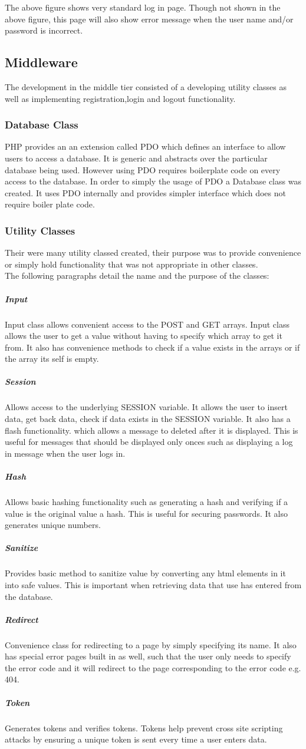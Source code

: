 \documentclass[a4paper,oneside,11pt]{report}
\begin{document}
The above figure shows very standard log in page. Though not shown in the above figure, this page will also show error message when the user name and/or password is incorrect.
\subsection{Middleware}
The development in the middle tier consisted of a developing utility classes as well as implementing registration,login and logout functionality.

\subsubsection{Database Class}
PHP provides an an extension called PDO which defines an interface to allow users to access a database. It is generic and abstracts over the particular database being used. However using PDO requires boilerplate code on every access to the database. In order to simply the usage of PDO a Database class was created. It uses PDO internally and provides simpler interface which does not require boiler plate code. 
\subsubsection{Utility Classes}
Their were many utility classed created, their purpose was to provide convenience or simply hold functionality that was not appropriate in other classes.
\\
The following paragraphs detail the name and the purpose of the classes: 
\subparagraph{Input}
Input class allows convenient access to the POST and GET arrays. Input class allows the user to get a value without having to specify which array to get it from. It also has convenience methods to check if a value exists in the arrays or if the array its self is empty. 
\subparagraph{Session}
Allows access to the underlying SESSION variable. It allows the user to insert data, get back data, check if data exists in the SESSION variable. It also has a flash functionality. which allows a message to deleted after it is displayed. This is useful for messages that should be displayed only onces such as displaying a log in message when the user logs in.
\subparagraph{Hash}
Allows basic hashing functionality such as generating a hash and verifying if a value is the original value a hash. This is useful for securing passwords. It also generates unique numbers.
\subparagraph{Sanitize}
Provides basic method to sanitize value by converting any html elements in it into safe values. This is important when retrieving data that use has entered from the database.
\subparagraph{Redirect}
Convenience class for redirecting to a page by simply specifying its name. It also has special error pages built in as well, such that the user only needs to specify the error code and it will redirect to the page corresponding to the error code e.g. 404.
\subparagraph{Token}
Generates tokens and verifies tokens. Tokens help prevent cross site scripting attacks by ensuring a unique token is sent every time a user enters data.
\end{document}
